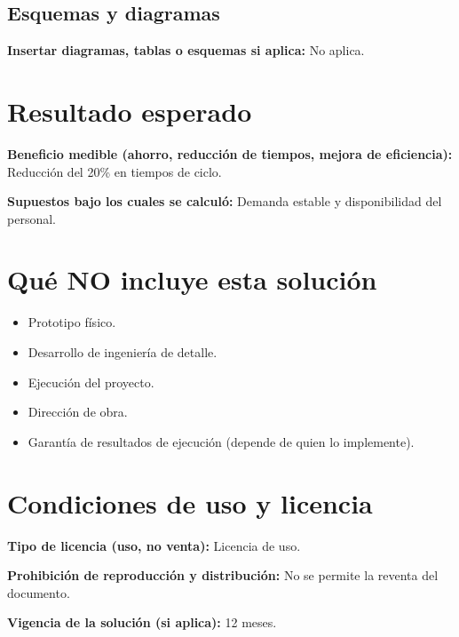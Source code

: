 \documentclass[11pt,a4paper]{article}
\newcommand{\campo}[2]{\textbf{\textcolor{irdblack}{#1:}} \textcolor{irdblack}{#2}\par\vspace{0.3em}}
\begin{document}
\subsection{Esquemas y diagramas}
\campo{Insertar diagramas, tablas o esquemas si aplica}{No aplica.}

\section{Resultado esperado}

\campo{Beneficio medible (ahorro, reducción de tiempos, mejora de eficiencia)}{Reducción del 20\% en tiempos de ciclo.}
\campo{Supuestos bajo los cuales se calculó}{Demanda estable y disponibilidad del personal.}

\section{Qué NO incluye esta solución}

\begin{alertbox}
\begin{itemize}[leftmargin=1.2em, itemsep=2pt]
    \item Prototipo físico.
    \item Desarrollo de ingeniería de detalle.
    \item Ejecución del proyecto.
    \item Dirección de obra.
    \item Garantía de resultados de ejecución (depende de quien lo implemente).
\end{itemize}
\end{alertbox}

\section{Condiciones de uso y licencia}

\campo{Tipo de licencia (uso, no venta)}{Licencia de uso.}
\campo{Prohibición de reproducción y distribución}{No se permite la reventa del documento.}
\campo{Vigencia de la solución (si aplica)}{12 meses.}
\end{document}
